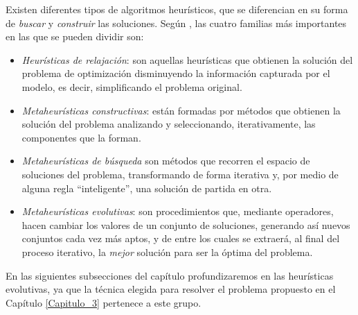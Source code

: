 \documentclass[12pt,a4paper]{book}
\begin{document}
Existen diferentes tipos de algoritmos heurísticos, que se diferencian en su forma de \textsl{buscar} y \textsl{construir} las soluciones. Según \cite{e_besada_optimizacion_nodate}, las cuatro familias más importantes en las que se pueden dividir son: 
\begin{itemize}
	\item \textsl{Heurísticas de relajación}: son aquellas heurísticas que obtienen la solución del problema de optimización disminuyendo la información capturada por el modelo, es decir, simplificando el problema original.
	\item \textsl{Metaheurísticas constructivas}: están formadas por métodos que obtienen la solución del problema analizando y seleccionando, iterativamente, las componentes que la forman.
	\item \textsl{Metaheurísticas de búsqueda} son métodos que recorren el espacio de soluciones del problema, transformando de forma iterativa y, por medio de alguna regla ``inteligente'', una solución de partida en otra.
	\item \textsl{Metaheurísticas evolutivas}: son procedimientos que, mediante operadores, hacen cambiar los valores de un conjunto de soluciones, generando así nuevos conjuntos cada vez más aptos, y de entre los cuales se extraerá, al final del proceso iterativo, la \textsl{mejor} solución para ser la óptima del problema.
\end{itemize}

En las siguientes subsecciones del capítulo profundizaremos en las heurísticas evolutivas, ya que la técnica elegida para resolver el problema propuesto en el Capítulo \ref{Capitulo_3} pertenece a este grupo.   
\end{document}
